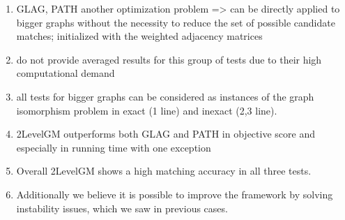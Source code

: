 \documentclass[handout]{beamer}
\begin{document}
\begin{frame}[allowframebreaks]
{\begin{enumerate}
\item GLAG, PATH another optimization problem => can be directly applied to bigger graphs without the necessity to reduce the set of possible candidate matches; initialized with the weighted adjacency matrices
\item do not provide averaged results for this group of tests due to their high computational demand
\item all tests for bigger graphs can be considered as instances of the graph isomorphism problem in exact (1 line) and inexact (2,3 line).

\item 2LevelGM outperforms both GLAG and PATH in objective score and especially in running time with one exception

\item Overall 2LevelGM shows a high matching accuracy in all three tests. 

\item Additionally we believe it is possible to improve the framework by solving instability issues, which we saw in previous cases. 
\end{enumerate}

}

\end{frame}
\end{document}
